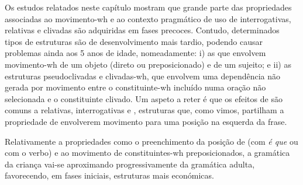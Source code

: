 \documentclass[output=paper]{LSP/langsci}
\begin{document}
Os estudos relatados neste capítulo mostram que grande parte das propriedades associadas ao movimento-wh e ao contexto pragmático de uso de interrogativas, relativas e clivadas são adquiridas em fases precoces. Contudo, determinados tipos de estruturas são de desenvolvimento mais tardio, podendo causar problemas ainda aos 5 anos de idade, nomeadamente: i) as que envolvem movimento-wh de um objeto (direto ou preposicionado) e  de um sujeito; e ii) as estruturas pseudoclivadas e clivadas-wh, que envolvem uma dependência não gerada por movimento entre o constituinte-wh incluído numa oração não selecionada e o constituinte clivado. Um aspeto a reter é que os efeitos de  são comuns a relativas, interrogativas e , estruturas que, como vimos, partilham a propriedade de envolverem movimento para uma posição na  esquerda da frase.

Relativamente a propriedades como o preenchimento da posição de  (com \textit{é que} ou com o verbo) e ao movimento de constituintes-wh preposicionados, a gramática da criança vai-se aproximando progressivamente da gramática adulta, favorecendo, em fases iniciais, estruturas mais económicas.

{\sloppy
\printbibliography[heading=subbibliography,notkeyword=this]
}
\end{document}
